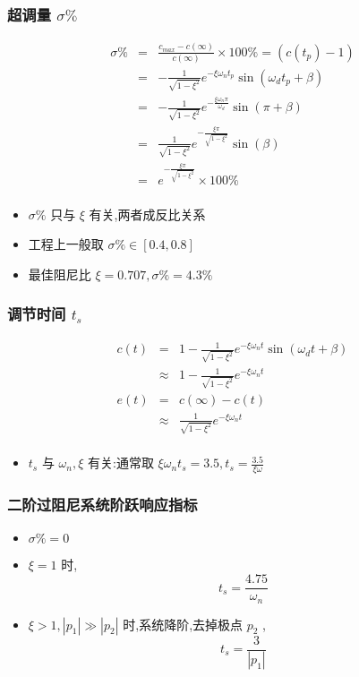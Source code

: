 \documentclass{article}
\begin{document}
\begin{frame}
\frametitle{超调量 $\sigma \%$}
\label{sec-1-3-4}

\begin{eqnarray*}
\sigma \% & = & \frac{c_{max}-c(\infty)}{c(\infty)}\times 100\% 
         = (c(t_p)-1) \\
         &=& -\frac{1}{\sqrt{1-\xi^2}}e^{-\xi\omega_n t_p}\sin(\omega_d t_p+\beta) \\
         &=& -\frac{1}{\sqrt{1-\xi^2}}e^{-\frac{\xi\omega_n\pi}{\omega_d}}\sin(\pi+\beta) \\
         &=& \frac{1}{\sqrt{1-\xi^2}}e^{-\frac{\xi\pi}{\sqrt{1-\xi^2}}}\sin(\beta) \\
         &=& e^{-\frac{\xi\pi}{\sqrt{1-\xi^2}}}\times 100\% \\
\end{eqnarray*}

\begin{itemize}
\item <2->$\sigma\%$ 只与 $\xi$ 有关,两者成反比关系
\item <3->工程上一般取 $\sigma\%\in[0.4,0.8]$
\item <4->最佳阻尼比 $\xi=0.707,\sigma\%=4.3\%$
\end{itemize}
\end{frame}
\begin{frame}
\frametitle{调节时间 $t_s$}
\label{sec-1-3-5}



\begin{eqnarray*}
c(t) & = & 1-\frac{1}{\sqrt{1-\xi^2}}e^{-\xi\omega_n t}\sin(\omega_d t+\beta)\\
     &\approx & 1-\frac{1}{\sqrt{1-\xi^2}}e^{-\xi\omega_n t} \\
e(t) &=& c(\infty)-c(t) \\
    &\approx& \frac{1}{\sqrt{1-\xi^2}}e^{-\xi\omega_n t}\\ 
\end{eqnarray*}

\begin{itemize}
\item <2-> $t_s$ 与 $\omega_n,\xi$ 有关:通常取 $\xi\omega_n t_s = 3.5,t_s=\frac{3.5}{\xi\omega}$
\end{itemize}
       
\end{frame}
\begin{frame}
\frametitle{二阶过阻尼系统阶跃响应指标}
\label{sec-1-3-6}

\begin{itemize}
\item <2->$\sigma\%=0$
\item <3->$\xi=1$ 时, 
       	\[t_s=\frac{4.75}{\omega_n}\]
\item <4->$\xi>1,|p_1|\gg |p_2|$ 时,系统降阶,去掉极点 $p_2$ , 
       \[t_s=\frac{3}{|p_1|}\]
\end{itemize}
\end{frame}
\end{document}
